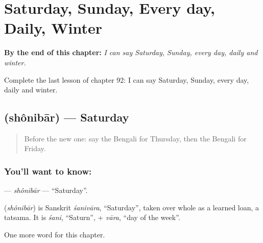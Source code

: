 
\chapter{Saturday, Sunday, Every day, Daily, Winter}
\label{ch:bn-saturday-sunday-every-day-daily-winter}

\begin{chapteropening}
\textbf{By the end of this chapter:} \emph{I can say Saturday, Sunday, every day, daily and winter.}

Complete the last lesson of chapter 92: I can say Saturday, Sunday, every day, daily and winter.
\end{chapteropening}

\section[\texorpdfstring{\bn{শনিবার} (shônibār)}{শনিবার (shônibār)}]{ (shônibār) — Saturday}

\label{lesson:BN-C92-shonibar}



\begin{quote}
Before the new one: say the Bengali for Thursday, then the Bengali for Friday.
\end{quote}

\subsection*{You'll want to know: }
\textbf{} — \emph{shônibār} — \textquotedblleft{}Saturday\textquotedblright{}.

\begin{cousinweb}
\textbf{} (\emph{shônibār}) is Sanskrit \emph{śanivāra}, \textquotedblleft{}Saturday\textquotedblright{}, taken over whole as a learned loan, a tatsama. It is \emph{śani}, \textquotedblleft{}Saturn\textquotedblright{}, + \emph{vāra}, \textquotedblleft{}day of the week\textquotedblright{}.
\end{cousinweb}

\begin{grammarlens}[title={What you've built}]
One more word for this chapter.
\end{grammarlens}

